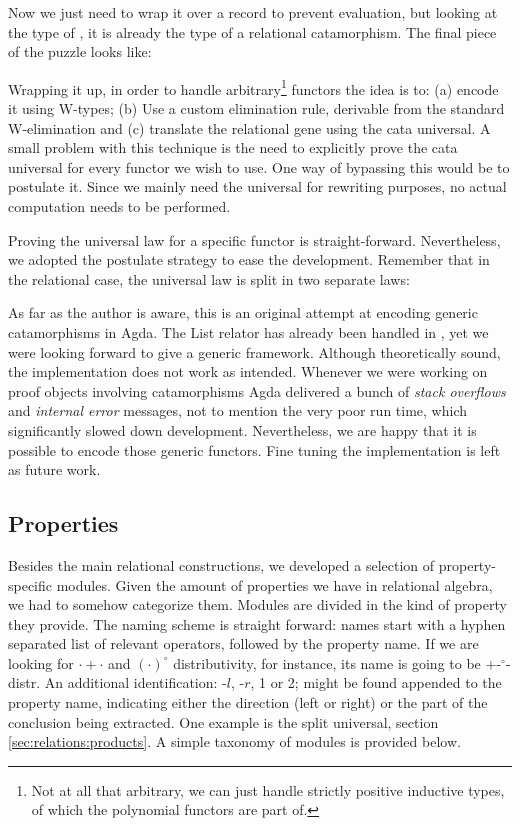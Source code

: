 Now we just need to wrap it over a record to prevent evaluation, but looking at the type
of , it is already the type of a relational catamorphism. The final piece of the puzzle looks like:


Wrapping it up, in order to handle arbitrary\footnote{
Not at all that arbitrary, we can just handle strictly positive inductive types, of which
the polynomial functors are part of.
} functors the idea is to: (a) encode it using W-types; (b) Use a custom elimination rule, derivable
from the standard W-elimination and (c) translate the relational gene using the cata universal. 
A small problem with this technique is the need to explicitly prove the cata universal for
every functor we wish to use. One way of bypassing this would be to postulate it. Since
we mainly need the universal for rewriting purposes, no actual computation needs to be performed.

Proving the universal law for a specific functor is straight-forward. Nevertheless, we adopted
the postulate strategy to ease the development. Remember that in the relational case, the universal
law is split in two separate laws:


As far as the author is aware, this is an original attempt at encoding generic catamorphisms
in Agda. The List relator has already been handled in \cite{Jansson09}, yet we were looking
forward to give a generic framework. Although theoretically sound, the implementation does
not work as intended. Whenever we were working on proof objects involving catamorphisms
Agda delivered a bunch of \emph{stack overflows} and \emph{internal error} messages, not to
mention the very poor run time, which significantly slowed down development. Nevertheless,
we are happy that it is possible to encode those generic functors. Fine tuning the implementation
is left as future work.


\subsection{Properties}

Besides the main relational constructions, we developed a selection of property-specific modules.
Given the amount of properties we have in relational algebra, we had to somehow categorize them.
Modules are divided in the kind of property they provide. The naming scheme is straight forward:
names start with a hyphen separated list of relevant operators, followed by the property name.
If we are looking for $\cdot + \cdot$ and $(\cdot)^\circ$ distributivity, for instance, 
its name is going to be $+$-$^\circ$-distr. An additional identification: -$l$, -$r$, 1 or 2; might be found
appended to the property name, indicating either the direction (left or right) or the part of 
the conclusion being extracted. One example is the split universal, section \ref{sec:relations:products}.
A simple taxonomy of modules is provided below.


